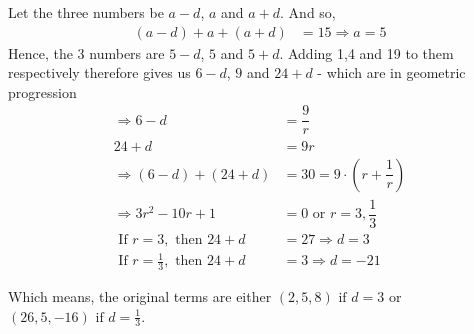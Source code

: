 \begin{solution}
	Let the three numbers be $a-d$, $a$ and $a+d$. And so,
	\begin{align}
		(a-d) + a + (a+d) &= 15 \Rightarrow a = 5
	\end{align}
	Hence, the 3 numbers are $5-d$, $5$ and $5+d$. Adding 1,4 and 19 to them respectively therefore gives us
	$6-d$, $9$ and $24+d$ - which are in geometric progression
	\begin{align}
		\Rightarrow 6-d &= \dfrac{9}{r} \\
		24+d &= 9r \\
		\Rightarrow (6-d) + (24+d) &= 30 = 9\cdot\left( r + \dfrac{1}{r}\right) \\
		\Rightarrow 3r^2 - 10r + 1 &= 0 \text{ or } r = 3, \dfrac{1}{3} \\
		\text{ If } r = 3, \text{ then } 24 + d &= 27 \Rightarrow d = 3 \\
		\text{ If } r = \frac{1}{3}, \text{ then } 24 + d &= 3 \Rightarrow d = -21
	\end{align}
	
	Which means, the original terms are either $(2,5,8) \text{ if } d = 3$ or $(26,5,-16) \text{ if } d = \frac{1}{3}$.	
\end{solution}
